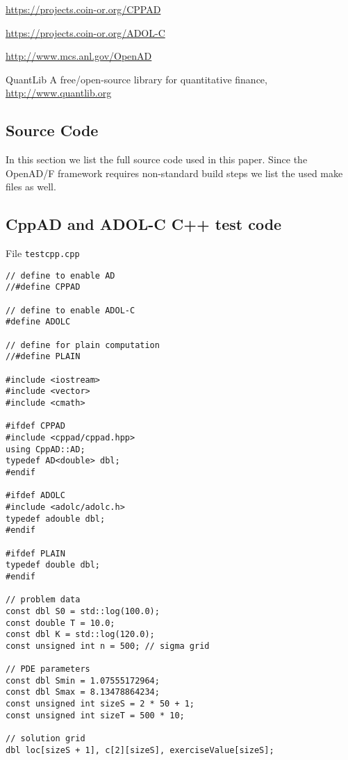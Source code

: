 \documentclass{amsart}
\theoremstyle{plain}
\numberwithin{equation}{section}
\begin{document}
\begin{thebibliography}{4}

\url{https://projects.coin-or.org/CPPAD}

\url{https://projects.coin-or.org/ADOL-C}

\url{http://www.mcs.anl.gov/OpenAD}

QuantLib A free/open-source library for quantitative finance, \url{http://www.quantlib.org}

\end{thebibliography}

\begin{appendix}

\section{Source Code}

In this section we list the full source code used in this paper. Since the OpenAD/F framework requires non-standard build steps we list the used make files as well.

\subsection{CppAD and ADOL-C C++ test code}

File \verb+testcpp.cpp+

\begin{verbatim}
// define to enable AD
//#define CPPAD

// define to enable ADOL-C
#define ADOLC

// define for plain computation
//#define PLAIN

#include <iostream>
#include <vector>
#include <cmath>

#ifdef CPPAD
#include <cppad/cppad.hpp>
using CppAD::AD;
typedef AD<double> dbl;
#endif

#ifdef ADOLC
#include <adolc/adolc.h>
typedef adouble dbl;
#endif

#ifdef PLAIN
typedef double dbl;
#endif

// problem data
const dbl S0 = std::log(100.0);
const double T = 10.0;
const dbl K = std::log(120.0);
const unsigned int n = 500; // sigma grid

// PDE parameters
const dbl Smin = 1.07555172964;
const dbl Smax = 8.13478864234;
const unsigned int sizeS = 2 * 50 + 1;
const unsigned int sizeT = 500 * 10;

// solution grid
dbl loc[sizeS + 1], c[2][sizeS], exerciseValue[sizeS];


\end{verbatim}
\end{appendix}
\end{document}
